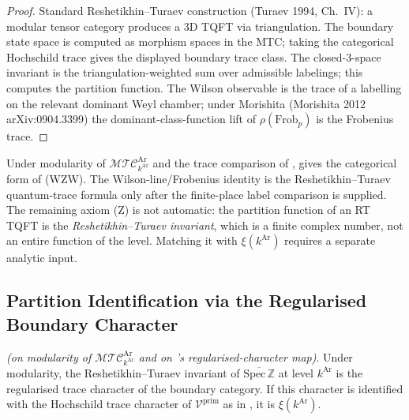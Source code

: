\begin{proof}
Standard Reshetikhin--Turaev construction (Turaev 1994, Ch.~IV):
a modular tensor category produces a 3D TQFT via triangulation.
The boundary state space is computed as morphism spaces in the
MTC; taking the categorical Hochschild trace gives the displayed
boundary trace class. The closed-3-space invariant is
the triangulation-weighted sum over admissible labelings; this
computes the partition function. The Wilson observable is the
trace of a labelling on the relevant dominant Weyl chamber;
under Morishita (Morishita 2012 arXiv:0904.3399) the
dominant-class-function lift of \(\rho(\mathrm{Frob}_{p})\) is the
Frobenius trace.
\end{proof}

\begin{remark}
\label{v4-arith:w10-a:rem:RT-closes-WZW-W}
Under modularity of
\(\mathcal{MTC}^{\mathrm{Ar}}_{k^{\mathrm{Ar}}}\) and the trace
comparison of ,
 gives the categorical
form of (WZW). The Wilson-line/Frobenius identity is the
Reshetikhin--Turaev quantum-trace formula only after the finite-place
label comparison is supplied. The remaining axiom (Z) is not
automatic: the partition function of an RT TQFT is the
\emph{Reshetikhin--Turaev invariant}, which is a finite complex
number, not an entire function of the level. Matching it with
\(\xi(k^{\mathrm{Ar}})\) requires a separate analytic input.
\end{remark}

\subsection{Partition Identification via the Regularised Boundary Character}
\label{v4-arith:w10-a:zhu-mod}

\begin{proposition}
\label{v4-arith:w10-a:prop:RT-Zhu}
\ClaimStatusConditional \emph{(on modularity of
\(\mathcal{MTC}^{\mathrm{Ar}}_{k^{\mathrm{Ar}}}\) and on
's regularised-character
map)}. Under modularity, the Reshetikhin--Turaev invariant of
\(\overline{\mathrm{Spec}\,\mathbb{Z}}\) at level \(k^{\mathrm{Ar}}\)
is the regularised trace character of the boundary category. If this
character is identified with the Hochschild trace character of
\(\mathcal{V}^{\mathrm{prim}}\) as in
, it is
\(\xi(k^{\mathrm{Ar}})\).
\end{proposition}


